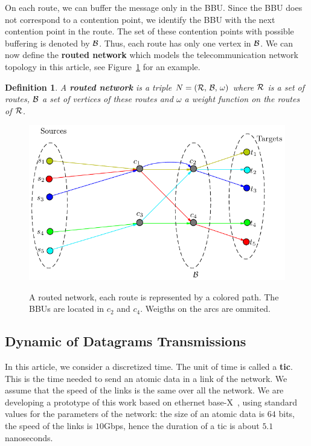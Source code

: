 \documentclass[a4paper,10pt]{journal}
\newtheorem{definition}{Definition}
\begin{document}
  	On each route, we can buffer the message only in the BBU. Since the BBU does not correspond to a contention point, we identify the BBU with the next contention point in the route. The set of these contention points with possible buffering is denoted by ${\cal B}$. Thus, each route has only one vertex in $\cal{B}$. We can now define the \textbf{routed network} which models the telecommunication network topology in this article, see Figure~\ref{fig:graphmodel} for an example. 


  	\begin{definition}
    A \textbf{routed network} is a triple $N = (\cal{R},\,\cal{B},\,\omega)$ where $\cal{R}$ is a set of routes, $\cal{B}$ a set of vertices of these routes and $\omega$ a weight function on the routes of $\cal{R}$. 
    \end{definition}
     


\begin{figure}
\centering

	
	\includegraphics[scale=0.7]{graphmodel}\\

\caption{A routed network, each route is represented by a colored path. The BBUs are located in $c_2$ and $c_4$. Weigths on the arcs are ommited.}
\label{fig:graphmodel}
\end{figure} 
 

	 
	 
 	\subsection{Dynamic of Datagrams Transmissions}
	    
 		In this article, we consider a discretized time. The unit of time is called a {\bf tic}. This is the time needed to send an atomic data in a link of the network. We assume that the speed of the links is the same over all the network. We are developing a prototype of this work based on ethernet base-X~\cite{ieee_8023}, using standard values for the parameters of the network: the size of an atomic data is $64$ bits, the speed of the links is $10$Gbps, hence the duration of a tic is about $5.1$ nanoseconds. 
\end{document}
